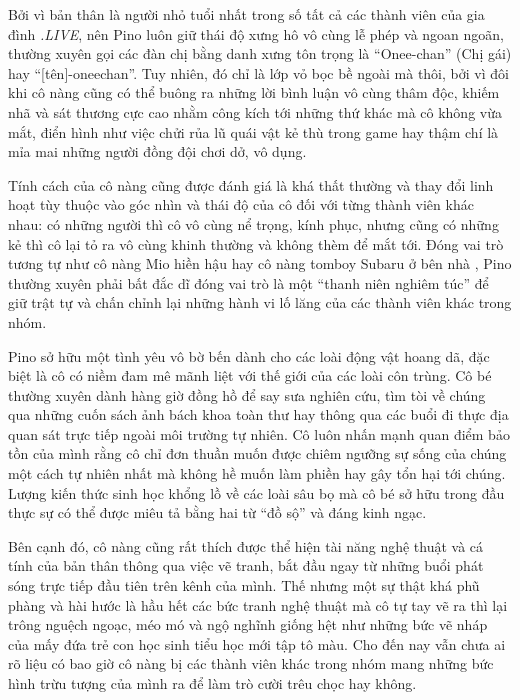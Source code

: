 \documentclass[../main.tex]{subfiles}
\begin{document}
Bởi vì bản thân là người nhỏ tuổi nhất trong số tất cả các thành viên của gia đình \textit{.LIVE}, nên Pino luôn giữ thái độ xưng hô vô cùng lễ phép và ngoan ngoãn, thường xuyên gọi các đàn chị bằng danh xưng tôn trọng là ``Onee-chan'' (Chị gái) hay ``[tên]-oneechan''. Tuy nhiên, đó chỉ là lớp vỏ bọc bề ngoài mà thôi, bởi vì đôi khi cô nàng cũng có thể buông ra những lời bình luận vô cùng thâm độc, khiếm nhã và sát thương cực cao nhằm công kích tới những thứ khác mà cô không vừa mắt, điển hình như việc chửi rủa lũ quái vật kẻ thù trong game hay thậm chí là mỉa mai những người đồng đội chơi dở, vô dụng.

Tính cách của cô nàng cũng được đánh giá là khá thất thường và thay đổi linh hoạt tùy thuộc vào góc nhìn và thái độ của cô đối với từng thành viên khác nhau: có những người thì cô vô cùng nể trọng, kính phục, nhưng cũng có những kẻ thì cô lại tỏ ra vô cùng khinh thường và không thèm để mắt tới. Đóng vai trò tương tự như cô nàng Mio hiền hậu hay cô nàng tomboy Subaru ở bên nhà \hll, Pino thường xuyên phải bất đắc dĩ đóng vai trò là một ``thanh niên nghiêm túc'' để giữ trật tự và chấn chỉnh lại những hành vi lố lăng của các thành viên khác trong nhóm.

Pino sở hữu một tình yêu vô bờ bến dành cho các loài động vật hoang dã, đặc biệt là cô có niềm đam mê mãnh liệt với thế giới của các loài côn trùng. Cô bé thường xuyên dành hàng giờ đồng hồ để say sưa nghiên cứu, tìm tòi về chúng qua những cuốn sách ảnh bách khoa toàn thư hay thông qua các buổi đi thực địa quan sát trực tiếp ngoài môi trường tự nhiên. Cô luôn nhấn mạnh quan điểm bảo tồn của mình rằng cô chỉ đơn thuần muốn được chiêm ngưỡng sự sống của chúng một cách tự nhiên nhất mà không hề muốn làm phiền hay gây tổn hại tới chúng. Lượng kiến thức sinh học khổng lồ về các loài sâu bọ mà cô bé sở hữu trong đầu thực sự có thể được miêu tả bằng hai từ ``đồ sộ'' và đáng kinh ngạc.

Bên cạnh đó, cô nàng cũng rất thích được thể hiện tài năng nghệ thuật và cá tính của bản thân thông qua việc vẽ tranh, bắt đầu ngay từ những buổi phát sóng trực tiếp đầu tiên trên kênh của mình. Thế nhưng một sự thật khá phũ phàng và hài hước là hầu hết các bức tranh nghệ thuật mà cô tự tay vẽ ra thì lại trông nguệch ngoạc, méo mó và ngộ nghĩnh giống hệt như những bức vẽ nháp của mấy đứa trẻ con học sinh tiểu học mới tập tô màu. Cho đến nay vẫn chưa ai rõ liệu có bao giờ cô nàng bị các thành viên khác trong nhóm mang những bức hình trừu tượng của mình ra để làm trò cười trêu chọc hay không.
\end{document}
